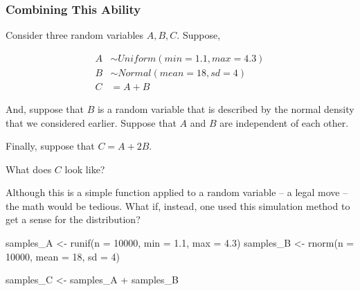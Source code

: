 \documentclass[
  letterpaper,
  DIV=11,
  numbers=noendperiod]{scrreprt}
\newenvironment{Shaded}{\begin{snugshade}}{\end{snugshade}}
\newcommand{\AttributeTok}[1]{\textcolor[rgb]{0.40,0.45,0.13}{#1}}
\newcommand{\DecValTok}[1]{\textcolor[rgb]{0.68,0.00,0.00}{#1}}
\newcommand{\FloatTok}[1]{\textcolor[rgb]{0.68,0.00,0.00}{#1}}
\newcommand{\FunctionTok}[1]{\textcolor[rgb]{0.28,0.35,0.67}{#1}}
\newcommand{\NormalTok}[1]{\textcolor[rgb]{0.00,0.23,0.31}{#1}}
\newcommand{\OtherTok}[1]{\textcolor[rgb]{0.00,0.23,0.31}{#1}}
\newcommand{\SpecialCharTok}[1]{\textcolor[rgb]{0.37,0.37,0.37}{#1}}
\begin{document}
\subsubsection{Combining This Ability}\label{combining-this-ability}

Consider three random variables \(A, B, C\). Suppose,

\[
\begin{aligned}    
  A & \sim Uniform(min=1.1, max=4.3) \\     
  B & \sim Normal(mean=18, sd=4)     \\     
  C &= A + B  \end{aligned}
\]

And, suppose that \(B\) is a random variable that is described by the
normal density that we considered earlier. Suppose that \(A\) and \(B\)
are independent of each other.

Finally, suppose that \(C = A + 2B\).

What does \(C\) look like?

Although this is a simple function applied to a random variable -- a
legal move -- the math would be tedious. What if, instead, one used this
simulation method to get a sense for the distribution?

\begin{Shaded}
\begin{Highlighting}[]
\NormalTok{samples\_A }\OtherTok{\textless{}{-}} \FunctionTok{runif}\NormalTok{(}\AttributeTok{n =} \DecValTok{10000}\NormalTok{, }\AttributeTok{min =} \FloatTok{1.1}\NormalTok{, }\AttributeTok{max =} \FloatTok{4.3}\NormalTok{)}
\NormalTok{samples\_B }\OtherTok{\textless{}{-}} \FunctionTok{rnorm}\NormalTok{(}\AttributeTok{n =} \DecValTok{10000}\NormalTok{, }\AttributeTok{mean =} \DecValTok{18}\NormalTok{, }\AttributeTok{sd =} \DecValTok{4}\NormalTok{)}

\NormalTok{samples\_C }\OtherTok{\textless{}{-}}\NormalTok{ samples\_A }\SpecialCharTok{+}\NormalTok{ samples\_B}
\end{Highlighting}
\end{Shaded}
\end{document}
